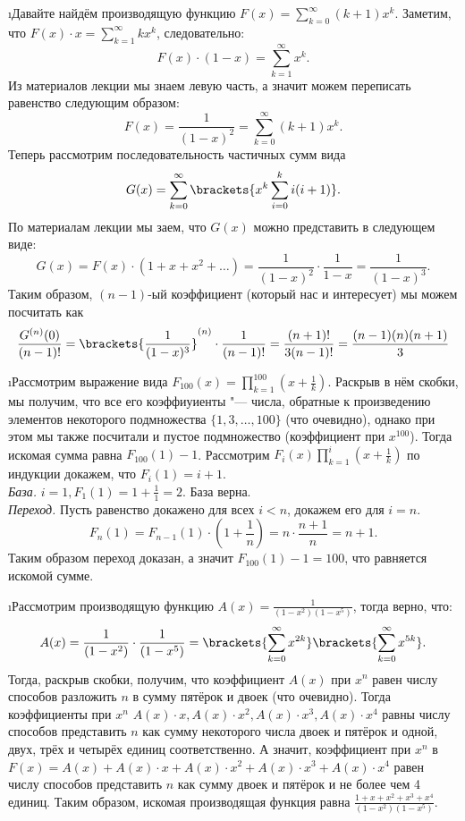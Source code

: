 \i Давайте найдём производящую функцию $F(x) = \displaystyle \sum_{k=0}^{\infty} (k+1)x^k$. Заметим, что $F(x)\cdot x = \displaystyle \sum_{k=1}^{\infty} k x^k$, следовательно:
$$F(x) \cdot (1-x) = \sum_{k=1}^{\infty} x^k.$$
Из материалов лекции мы знаем левую часть, а значит можем переписать равенство следующим образом:
$$F(x) = \frac{1}{(1-x)^2} = \sum_{k=0}^{\infty} (k+1)x^k.$$
Теперь рассмотрим последовательность частичных сумм вида 
$$G(x) = \sum_{k=0}^{\infty}\brackets{x^k\sum_{i=0}^{k}i(i+1)}.$$
По материалам лекции мы заем, что $G(x)$ можно представить в следующем виде:
$$G(x) = F(x)\cdot(1+x+x^2+\ldots) = \frac{1}{(1-x)^2} \cdot \frac{1}{1-x} = \frac{1}{(1-x)^3}.$$
Таким образом, $(n-1)$-ый коэффициент (который нас и интересует) мы можем посчитать как 
$$\frac{G^{(n)}(0)}{(n-1)!} = \brackets{\frac{1}{(1-x)^3}}^{(n)} \cdot \frac{1}{(n-1)!} = \frac{(n+1)!}{3(n-1)!} = \frac{(n-1)(n)(n+1)}{3}$$

\i Рассмотрим выражение вида $F_{100}(x) = \displaystyle\prod_{k=1}^{100} (x+\frac{1}{k})$. Раскрыв в нём скобки, мы получим, что все его коэффиуиенты "--- числа, обратные к произведению элементов некоторого подмножества $\{1, 3, \ldots, 100\}$ (что очевидно), однако при этом мы также посчитали и пустое подмножество (коэффициент при $x^{100}$). Тогда искомая сумма равна $F_{100}(1)-1$. Рассмотрим $F_i(x)\displaystyle\prod_{k=1}^{i} (x+\frac{1}{k})$ по индукции докажем, что $F_i(1) = i+1$.\\
\textit{База.} $i=1, F_1(1) = 1 + \frac{1}{1} = 2$. База верна.\\
\textit{Переход.} Пусть равенство докажено для всех $i < n$, докажем его для $i = n$.
$$F_n(1) = F_{n-1}(1) \cdot (1 + \frac{1}{n}) = n \cdot \frac{n+1}{n} = n+1.$$
Таким образом переход доказан, а значит $F_{100}(1) - 1 = 100$, что равняется искомой сумме.

\i Рассмотрим производящую функцию $A(x) = \frac{1}{(1-x^2)(1-x^5)}$, тогда верно, что:
$$A(x) = \frac{1}{(1-x^2)} \cdot \frac{1}{(1-x^5)} = \brackets{\sum_{k=0}^{\infty}x^{2k}} \brackets{\sum_{k=0}^{\infty}x^{5k}}.$$
Тогда, раскрыв скобки, получим, что коэффициент $A(x)$ при $x^n$ равен числу способов разложить $n$ в сумму пятёрок и двоек (что очевидно). Тогда коэффициенты при $x^n$ $A(x)\cdot x, A(x)\cdot x^2, A(x)\cdot x^3, A(x)\cdot x^4$ равны числу способов представить $n$ как сумму некоторого числа двоек и пятёрок и одной, двух, трёх и четырёх единиц соответственно. А значит, коэффициент при $x^n$ в $F(x) = A(x) + A(x)\cdot x + A(x)\cdot x^2 +  A(x)\cdot x^3 +  A(x)\cdot x^4$ равен числу способов представить $n$ как сумму двоек и пятёрок и не более чем 4 единиц. Таким образом, искомая производящая функция равна $\displaystyle\frac{1 + x + x^2 + x^3 + x^4}{(1-x^2)(1-x^5)}$.